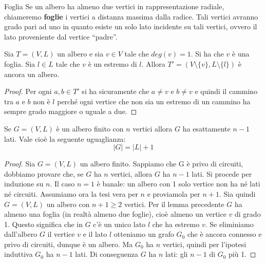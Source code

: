 \begin{defbox}{Foglia}
	Se un albero ha almeno due vertici in rappresentazione radiale, chiameremo \textbf{foglie} i vertici a distanza massima dalla radice. Tali vertici avranno grado pari ad uno in quanto esiste un solo lato incidente su tali vertici, ovvero il lato proveniente dal vertice ``padre''.
\end{defbox}


\begin{lemmabox}
	    Sia $T=(V,L)$ un albero e sia $v \in V$ tale che $deg(v) = 1$. Si ha che $v$ è una foglia. Sia $l \in L$ tale che $v$ è un estremo di $l$. Allora $T'=(V\setminus \{v\}, L \setminus \{l\})$ è ancora un albero.
\end{lemmabox}


\begin{proof}
	 Per ogni $a,b \in T'$ si ha sicuramente che $a \neq v$ e $b \neq v$ e quindi il cammino tra $a$ e $b$ non è $l$ perché ogni vertice che non sia un estremo di un cammino ha sempre grado maggiore o uguale a due. 
\end{proof}


\begin{propbox}
	    Se $G = (V,L)$ è un albero finito con $n$ vertici allora $G$ ha esattamente $n-1$ lati. Vale cioè la seguente uguaglianza:
    \begin{displaymath}
        |G| = |L|+1
    \end{displaymath}
\end{propbox}

\begin{proof}
	Sia $G = (V, L)$ un albero finito. Sappiamo che G è privo di circuiti, dobbiamo provare che, se $G$ ha $n$ vertici, allora $G$ ha $n-1$ lati. Si procede per induzione su $n$. Il caso $n = 1$ è banale: un albero con 1 solo vertice non ha né lati né circuiti. Assumiamo ora la tesi vera per $n$ e proviamola per $n + 1$. Sia
quindi $G = (V, L)$ un albero con $n + 1 \geq 2 $ vertici. Per il lemma precedente
$G$ ha almeno una foglia (in realtà almeno due foglie), cioè almeno un vertice
$v$ di grado 1. Questo significa che in $G$ c'è un unico lato $l$ che ha estremo $v$.
Se eliminiamo dall'albero $G$ il vertice $v$ e il lato $l$ otteniamo un grafo $G_{0}$ che
è ancora connesso e privo di circuiti, dunque è un albero. Ma $G_{0}$ ha $n$ vertici,
quindi per l'ipotesi induttiva $G_{0}$ ha $n-1$ lati. Di conseguenza $G$ ha $n$ lati: gli
$n-1$ di $G_{0}$ più 1.
\end{proof}

